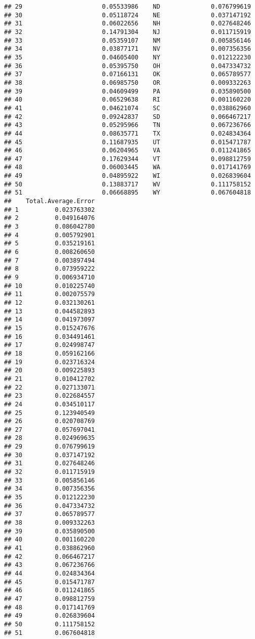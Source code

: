 \documentclass{article}\usepackage[]{graphicx}\usepackage[]{color}
\makeatletter
\newenvironment{kframe}{%
 \def\at@end@of@kframe{}%
 \ifinner\ifhmode%
  \def\at@end@of@kframe{\end{minipage}}%
  \begin{minipage}{\columnwidth}%
 \fi\fi%
 \def\FrameCommand##1{\hskip\@totalleftmargin \hskip-\fboxsep
 \colorbox{shadecolor}{##1}\hskip-\fboxsep
     \hskip-\linewidth \hskip-\@totalleftmargin \hskip\columnwidth}%
 \MakeFramed {\advance\hsize-\width
   \@totalleftmargin\z@ \linewidth\hsize
   \@setminipage}}%
 {\par\unskip\endMakeFramed%
 \at@end@of@kframe}
\newenvironment{knitrout}{}{} %
\makeatother
\begin{document}
\begin{knitrout}
\begin{kframe}
\begin{verbatim}
## 29                      0.05533986    ND              0.076799619
## 30                      0.05118724    NE              0.037147192
## 31                      0.06022656    NH              0.027648246
## 32                      0.14791304    NJ              0.011715919
## 33                      0.05359107    NM              0.005856146
## 34                      0.03877171    NV              0.007356356
## 35                      0.04605400    NY              0.012122230
## 36                      0.05395750    OH              0.047334732
## 37                      0.07166131    OK              0.065789577
## 38                      0.06985750    OR              0.009332263
## 39                      0.04609499    PA              0.035890500
## 40                      0.06529638    RI              0.001160220
## 41                      0.04621074    SC              0.038862960
## 42                      0.09242837    SD              0.066467217
## 43                      0.05295966    TN              0.067236766
## 44                      0.08635771    TX              0.024834364
## 45                      0.11687935    UT              0.015471787
## 46                      0.06204965    VA              0.011241865
## 47                      0.17629344    VT              0.098812759
## 48                      0.06003445    WA              0.017141769
## 49                      0.04895922    WI              0.026839604
## 50                      0.13883717    WV              0.111758152
## 51                      0.06668895    WY              0.067604818
##    Total.Average.Error
## 1          0.023763302
## 2          0.049164076
## 3          0.086042780
## 4          0.005792901
## 5          0.035219161
## 6          0.008260650
## 7          0.003897494
## 8          0.073959222
## 9          0.006934710
## 10         0.010225740
## 11         0.002075579
## 12         0.032130261
## 13         0.044582893
## 14         0.041973097
## 15         0.015247676
## 16         0.034491461
## 17         0.024998747
## 18         0.059162166
## 19         0.023716324
## 20         0.009225893
## 21         0.010412702
## 22         0.027133071
## 23         0.022684557
## 24         0.034510117
## 25         0.123940549
## 26         0.020708769
## 27         0.057697041
## 28         0.024969635
## 29         0.076799619
## 30         0.037147192
## 31         0.027648246
## 32         0.011715919
## 33         0.005856146
## 34         0.007356356
## 35         0.012122230
## 36         0.047334732
## 37         0.065789577
## 38         0.009332263
## 39         0.035890500
## 40         0.001160220
## 41         0.038862960
## 42         0.066467217
## 43         0.067236766
## 44         0.024834364
## 45         0.015471787
## 46         0.011241865
## 47         0.098812759
## 48         0.017141769
## 49         0.026839604
## 50         0.111758152
## 51         0.067604818
\end{verbatim}
\end{kframe}
\end{knitrout}
\end{document}
